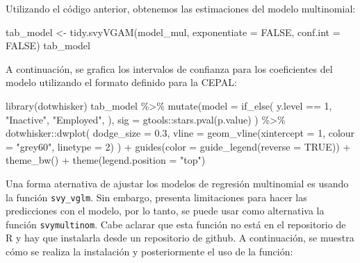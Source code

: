 \documentclass[
  12pt,
]{book}
\newenvironment{Shaded}{\begin{snugshade}}{\end{snugshade}}
\newcommand{\AttributeTok}[1]{\textcolor[rgb]{0.77,0.63,0.00}{#1}}
\newcommand{\ConstantTok}[1]{\textcolor[rgb]{0.00,0.00,0.00}{#1}}
\newcommand{\DecValTok}[1]{\textcolor[rgb]{0.00,0.00,0.81}{#1}}
\newcommand{\FloatTok}[1]{\textcolor[rgb]{0.00,0.00,0.81}{#1}}
\newcommand{\FunctionTok}[1]{\textcolor[rgb]{0.00,0.00,0.00}{#1}}
\newcommand{\NormalTok}[1]{#1}
\newcommand{\OtherTok}[1]{\textcolor[rgb]{0.56,0.35,0.01}{#1}}
\newcommand{\SpecialCharTok}[1]{\textcolor[rgb]{0.00,0.00,0.00}{#1}}
\newcommand{\StringTok}[1]{\textcolor[rgb]{0.31,0.60,0.02}{#1}}
\begin{document}
Utilizando el código anterior, obtenemos las estimaciones del modelo multinomial:

\begin{Shaded}
\begin{Highlighting}[]
\NormalTok{tab\_model }\OtherTok{\textless{}{-}} \FunctionTok{tidy.svyVGAM}\NormalTok{(model\_mul, }
                               \AttributeTok{exponentiate =} \ConstantTok{FALSE}\NormalTok{, }
                               \AttributeTok{conf.int =} \ConstantTok{FALSE}\NormalTok{) }
\NormalTok{tab\_model}
\end{Highlighting}
\end{Shaded}

A continuación, se grafica los intervalos de confianza para los coeficientes del modelo utilizando el formato definido para la CEPAL:

\begin{Shaded}
\begin{Highlighting}[]
\FunctionTok{library}\NormalTok{(dotwhisker)}
\NormalTok{tab\_model }\SpecialCharTok{\%\textgreater{}\%} 
  \FunctionTok{mutate}\NormalTok{(}\AttributeTok{model =} \FunctionTok{if\_else}\NormalTok{(}
\NormalTok{      y.level }\SpecialCharTok{==} \DecValTok{1}\NormalTok{, }
      \StringTok{"Inactive"}\NormalTok{,}
      \StringTok{"Employed"}\NormalTok{, ),}
    \AttributeTok{sig =}\NormalTok{ gtools}\SpecialCharTok{::}\FunctionTok{stars.pval}\NormalTok{(p.value)}
\NormalTok{  )  }\SpecialCharTok{\%\textgreater{}\%} 
\NormalTok{  dotwhisker}\SpecialCharTok{::}\FunctionTok{dwplot}\NormalTok{(}
    \AttributeTok{dodge\_size =} \FloatTok{0.3}\NormalTok{,}
    \AttributeTok{vline =} \FunctionTok{geom\_vline}\NormalTok{(}\AttributeTok{xintercept =} \DecValTok{1}\NormalTok{, }\AttributeTok{colour =} \StringTok{"grey60"}\NormalTok{,}
                       \AttributeTok{linetype =} \DecValTok{2}\NormalTok{)}
\NormalTok{  ) }\SpecialCharTok{+} 
  \FunctionTok{guides}\NormalTok{(}\AttributeTok{color =} \FunctionTok{guide\_legend}\NormalTok{(}\AttributeTok{reverse =} \ConstantTok{TRUE}\NormalTok{)) }\SpecialCharTok{+} 
  \FunctionTok{theme\_bw}\NormalTok{() }\SpecialCharTok{+} \FunctionTok{theme}\NormalTok{(}\AttributeTok{legend.position =} \StringTok{"top"}\NormalTok{)}
\end{Highlighting}
\end{Shaded}

Una forma aternativa de ajustar los modelos de regresión multinomial es usando la función \texttt{svy\_vglm}. Sin embargo, presenta limitaciones para hacer las predicciones con el modelo, por lo tanto, se puede usar como alternativa la función \texttt{svymultinom}. Cabe aclarar que esta función no está en el repositorio de R y hay que instalarla desde un repositorio de github. A continuación, se muestra cómo se realiza la instalación y posteriormente el uso de la función:
\end{document}

